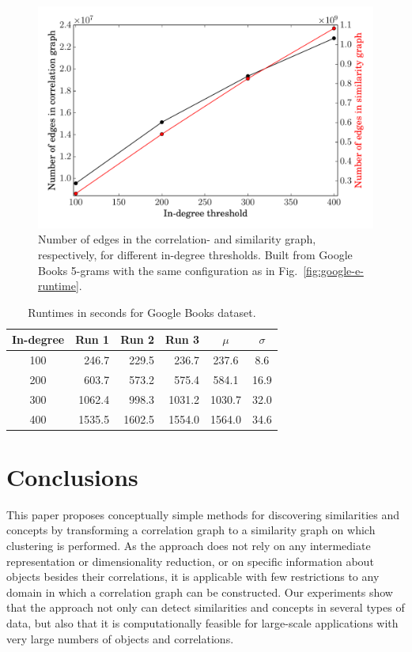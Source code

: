 \documentclass{kais}
\begin{document}
\begin{figure}
\centerline{\includegraphics[width=0.75\columnwidth]{figures/eng-all-edge-low-e3-vtx-low-e8-high-e1-100-400-idg-ne-nt.pdf}}
\caption{Number of edges in the correlation- and similarity graph, respectively, for different in-degree thresholds. Built from Google Books 5-grams
with the same configuration as in Fig.\ \ref{fig:google-e-runtime}.}
\label{fig:google-ne}
\end{figure}

\begin{table}
\renewcommand{\arraystretch}{1.3}
\caption{Runtimes in seconds for Google Books dataset.}
\label{tab:google_runtimes}
\begin{center}
\begin{tabular}{c|r|r|r||c|c}
  \hline \bfseries In-degree  & \bfseries Run 1
  & \bfseries Run 2
  & \bfseries Run 3
  & \bfseries $\mu$
  & \bfseries $\sigma$
  \\
  \hline\hline 100
  & 246.7
  & 229.5
  & 236.7
  & 237.6
  & 8.6
  \\
  \hline 200
  & 603.7
  & 573.2
  & 575.4
  & 584.1
  & 16.9
  \\
  \hline 300
  & 1062.4
  & 998.3
  & 1031.2
  & 1030.7
  & 32.0
  \\
  \hline 400
  & 1535.5
  & 1602.5
  & 1554.0
  & 1564.0
  & 34.6
  \\
  \hline
\end{tabular}
\end{center}
\end{table}

\section{Conclusions}
\label{sec:conclusions}

This paper proposes conceptually simple methods for discovering similarities and concepts by 
transforming a correlation graph to a similarity graph on which clustering is performed. As the approach does not rely on any
intermediate representation or dimensionality reduction, or on specific information about objects besides
their correlations, it is applicable with few restrictions
to any domain in which a correlation graph can be constructed. Our experiments show that the approach not only can
detect similarities and concepts in several types of data, but also that it is computationally feasible for large-scale
applications with very large numbers of objects and correlations.
\end{document}
